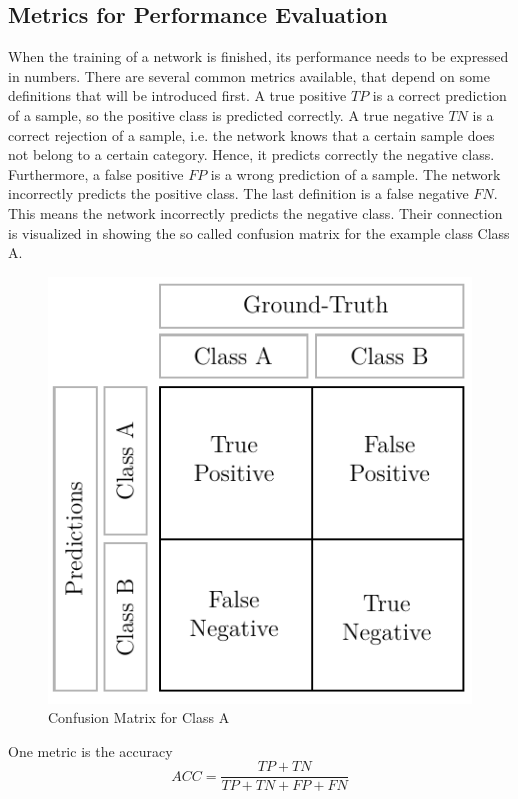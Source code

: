 \subsection{Metrics for Performance Evaluation}
\label{sec:neural-networks-metrics}
When the training of a network is finished, its performance needs to be expressed in numbers.
There are several common metrics available, that depend on some definitions that will be introduced first.
A true positive $TP$ is a correct prediction of a sample, so the positive class is predicted correctly.
A true negative $TN$ is a correct rejection of a sample, i.e. the network knows that a certain sample does not belong to a certain category.
Hence, it predicts correctly the negative class.
Furthermore, a false positive $FP$ is a wrong prediction of a sample.
The network incorrectly predicts the positive class.
The last definition is a false negative $FN$.
This means the network incorrectly predicts the negative class.
Their connection is visualized in  showing the so called confusion matrix\cite{Fawcett:2006:IRA:1159473.1159475} for the example class Class A.
\begin{figure}
	\centering
	\includegraphics[]{images/confusion_matrix.pdf}
	\caption[Confusion Matrix]{Confusion Matrix for Class A}
	\label{fig:confusion-matrix}
\end{figure}
One metric is the accuracy
\begin{equation}
	ACC = \frac{TP + TN}{TP + TN + FP + FN}
\end{equation}
